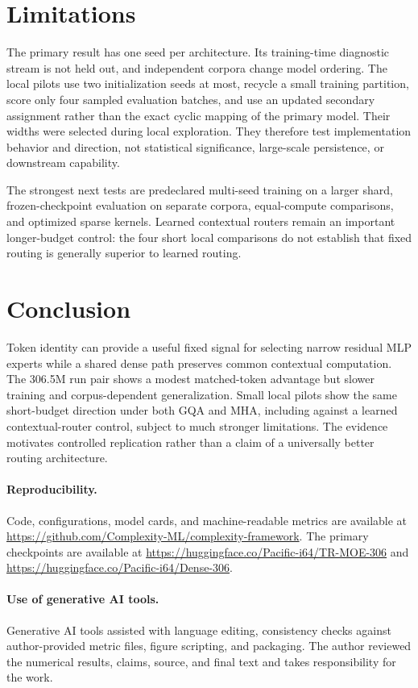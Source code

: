 \documentclass[10pt,twocolumn]{article}
\begin{document}
\section{Limitations}

The primary result has one seed per architecture. Its training-time diagnostic
stream is not held out, and independent corpora change model ordering. The
local pilots use two initialization seeds at most, recycle a small training
partition, score only four sampled evaluation batches, and use an updated
secondary assignment rather than the exact cyclic mapping of the primary
model. Their widths were selected during local exploration. They therefore
test implementation behavior and direction, not statistical significance,
large-scale persistence, or downstream capability.

The strongest next tests are predeclared multi-seed training on a larger
shard, frozen-checkpoint evaluation on separate corpora, equal-compute
comparisons, and optimized sparse kernels. Learned contextual routers remain
an important longer-budget control: the four short local comparisons do not
establish that fixed routing is generally superior to learned routing.

\section{Conclusion}

Token identity can provide a useful fixed signal for selecting narrow residual
MLP experts while a shared dense path preserves common contextual computation.
The 306.5M run pair shows a modest matched-token advantage but slower training
and corpus-dependent generalization. Small local pilots show the same
short-budget direction under both GQA and MHA, including against a learned
contextual-router control, subject to much stronger limitations. The evidence
motivates controlled replication rather than a claim of a universally better
routing architecture.

\paragraph{Reproducibility.}
Code, configurations, model cards, and machine-readable metrics are available
at \url{https://github.com/Complexity-ML/complexity-framework}. The primary
checkpoints are available at
\url{https://huggingface.co/Pacific-i64/TR-MOE-306} and
\url{https://huggingface.co/Pacific-i64/Dense-306}.

\paragraph{Use of generative AI tools.}
Generative AI tools assisted with language editing, consistency checks against
author-provided metric files, figure scripting, and packaging. The author
reviewed the numerical results, claims, source, and final text and takes
responsibility for the work.



\end{document}
